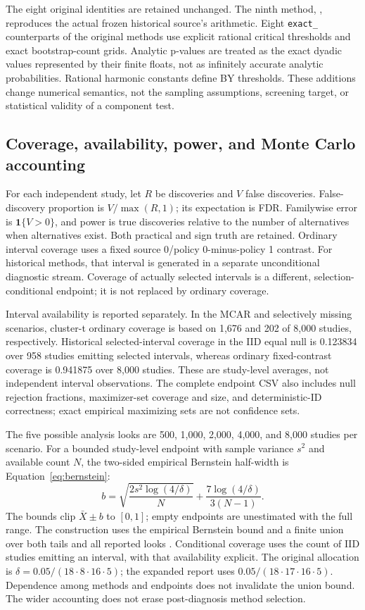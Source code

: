 The eight original identities are retained unchanged. The ninth method,
, reproduces the actual frozen
historical source's arithmetic. Eight \texttt{exact\_} counterparts of the
original methods use explicit rational critical thresholds and exact
bootstrap-count grids. Analytic p-values are treated as the exact dyadic
values represented by their finite floats, not as infinitely accurate
analytic probabilities. Rational harmonic constants define BY thresholds.
These additions change numerical semantics, not the sampling assumptions,
screening target, or statistical validity of a component test.

\subsection{Coverage, availability, power, and Monte Carlo accounting}
For each independent study, let $R$ be discoveries and $V$ false discoveries.
False-discovery proportion is $V/\max(R,1)$; its expectation is FDR.
Familywise error is $\mathbf{1}\{V>0\}$, and power is true discoveries
relative to the number of alternatives when alternatives exist. Both
practical and sign truth are retained. Ordinary interval coverage uses a
fixed source 0/policy 0-minus-policy 1 contrast. For historical methods,
that interval is generated in a separate unconditional diagnostic stream.
Coverage of actually selected intervals is a different, selection-conditional
endpoint; it is not replaced by ordinary coverage.

Interval availability is reported separately. In the MCAR and selectively
missing scenarios, cluster-t ordinary coverage is based on 1,676 and 202
of 8,000 studies, respectively. Historical selected-interval coverage in
the IID equal null is 0.123834 over 958 studies emitting selected intervals,
whereas ordinary fixed-contrast coverage is 0.941875 over 8,000 studies.
These are study-level averages, not independent interval observations.
The complete endpoint CSV also includes null rejection fractions,
maximizer-set coverage and size, and deterministic-ID correctness; exact
empirical maximizing sets are not confidence sets.

The five possible analysis looks are 500, 1,000, 2,000, 4,000, and 8,000
studies per scenario. For a bounded study-level endpoint with sample variance
$s^2$ and available count $N$, the two-sided empirical Bernstein half-width is
Equation~\ref{eq:bernstein}:
\begin{equation}\label{eq:bernstein}
 b=\sqrt{\frac{2s^2\log(4/\delta)}{N}}
 +\frac{7\log(4/\delta)}{3(N-1)}.
\end{equation}
The bounds clip $\bar X\pm b$ to $[0,1]$; empty endpoints are unestimated
with the full range. The construction uses the empirical Bernstein bound
and a finite union over both tails and all reported looks
\citep{maurer2009}. Conditional coverage uses the count of IID studies
emitting an interval, with that availability explicit.
The original allocation is $\delta=0.05/(18\cdot8\cdot16\cdot5)$;
the expanded report uses $0.05/(18\cdot17\cdot16\cdot5)$.
Dependence among methods and endpoints does not invalidate the union bound.
The wider accounting does not erase post-diagnosis method selection.

